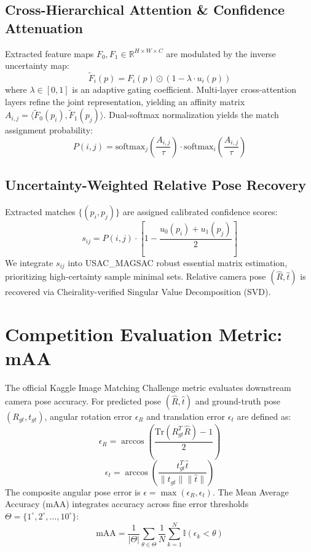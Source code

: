 \documentclass[10pt,twocolumn,letterpaper]{article}
\begin{document}
\subsection{Cross-Hierarchical Attention \& Confidence Attenuation}
Extracted feature maps $F_0, F_1 \in \mathbb{R}^{H \times W \times C}$ are modulated by the inverse uncertainty map:
\begin{equation}
    \tilde{F}_i(p) = F_i(p) \odot (1 - \lambda \cdot u_i(p))
\end{equation}
where $\lambda \in [0, 1]$ is an adaptive gating coefficient. Multi-layer cross-attention layers refine the joint representation, yielding an affinity matrix $A_{i,j} = \langle \tilde{F}_0(p_i), \tilde{F}_1(p_j) \rangle$. Dual-softmax normalization yields the match assignment probability:
\begin{equation}
    P(i, j) = \mathrm{softmax}_j\left(\frac{A_{i,j}}{\tau}\right) \cdot \mathrm{softmax}_i\left(\frac{A_{i,j}}{\tau}\right)
\end{equation}

\subsection{Uncertainty-Weighted Relative Pose Recovery}
Extracted matches $\{ (p_i, p_j) \}$ are assigned calibrated confidence scores:
\begin{equation}
    s_{ij} = P(i, j) \cdot \left[1 - \frac{u_0(p_i) + u_1(p_j)}{2}\right]
\end{equation}
We integrate $s_{ij}$ into USAC\_MAGSAC robust essential matrix estimation, prioritizing high-certainty sample minimal sets. Relative camera pose $(\hat{R}, \hat{t})$ is recovered via Cheirality-verified Singular Value Decomposition (SVD).

\section{Competition Evaluation Metric: mAA}
\label{sec:metric}
The official Kaggle Image Matching Challenge metric evaluates downstream camera pose accuracy. For predicted pose $(\hat{R}, \hat{t})$ and ground-truth pose $(R_{gt}, t_{gt})$, angular rotation error $\epsilon_R$ and translation error $\epsilon_t$ are defined as:
\begin{equation}
    \epsilon_R = \arccos \left( \frac{\mathrm{Tr}(R_{gt}^T \hat{R}) - 1}{2} \right)
\end{equation}
\begin{equation}
    \epsilon_t = \arccos \left( \frac{t_{gt}^T \hat{t}}{\|t_{gt}\| \|\hat{t}\|} \right)
\end{equation}
The composite angular pose error is $\epsilon = \max(\epsilon_R, \epsilon_t)$. The Mean Average Accuracy (mAA) integrates accuracy across fine error thresholds $\Theta = \{1^\circ, 2^\circ, \dots, 10^\circ\}$:
\begin{equation}
    \mathrm{mAA} = \frac{1}{|\Theta|} \sum_{\theta \in \Theta} \frac{1}{N} \sum_{k=1}^N \mathbb{I}(\epsilon_k < \theta)
\end{equation}
\end{document}
